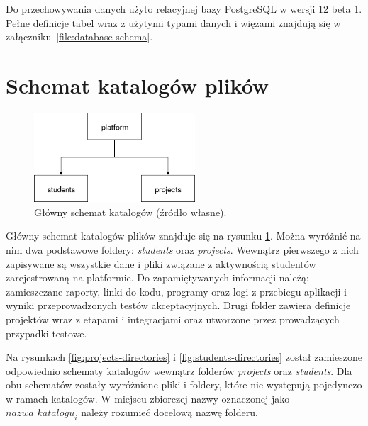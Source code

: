 Do przechowywania danych użyto relacyjnej bazy PostgreSQL w wersji 12 beta 1.
Pełne definicje tabel wraz z użytymi typami danych i więzami znajdują się w załączniku~\ref{file:database-schema}.


\section{Schemat katalogów plików}
\label{directories}

\begin{figure}[h]
    \centering
    \includegraphics[width = 6cm]{chapter02/platform_main_dirs.png}
    \caption{Główny schemat katalogów (źródło własne).}
    \label{fig:platform-main-directories}
\end{figure}

Główny schemat katalogów plików znajduje się na rysunku \ref{fig:platform-main-directories}.
Można wyróżnić na nim dwa podstawowe foldery: \textit{students} oraz \textit{projects}.
Wewnątrz pierwszego z nich zapisywane są wszystkie dane i pliki związane z aktywnością studentów zarejestrowaną na platformie.
Do zapamiętywanych informacji należą: zamieszczane raporty, linki do kodu, programy oraz logi z przebiegu aplikacji i wyniki przeprowadzonych testów akceptacyjnych.
Drugi folder zawiera definicje projektów wraz z etapami i integracjami oraz utworzone przez prowadzących przypadki testowe.

Na rysunkach \ref{fig:projects-directories} i \ref{fig:students-directories} został zamieszone odpowiednio schematy katalogów wewnątrz folderów \textit{projects} oraz \textit{students}.
Dla obu schematów zostały wyróżnione pliki i foldery, które nie występują pojedynczo w ramach katalogów.
W miejscu zbiorczej nazwy oznaczonej jako ${nazwa\_katalogu}_{i}$ należy rozumieć docelową nazwę folderu.

